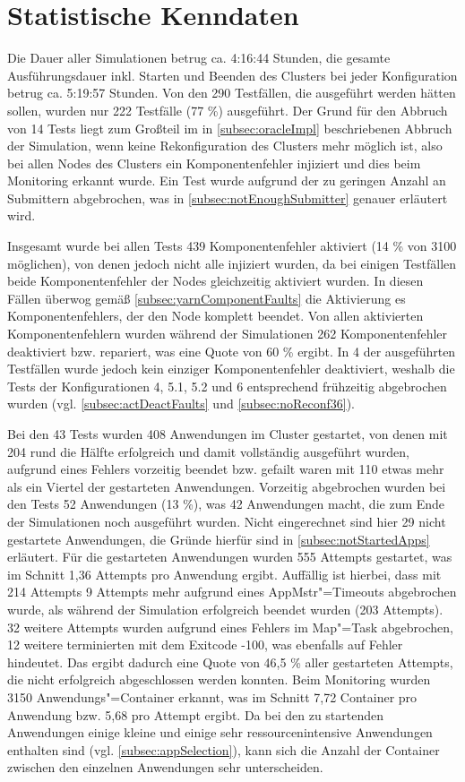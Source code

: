 \section{Statistische Kenndaten}
\label{sec:evaluationStats}

Die Dauer aller Simulationen betrug ca. 4:16:44 Stunden, die gesamte Ausführungsdauer inkl. Starten und Beenden des Clusters bei jeder Konfiguration betrug ca. 5:19:57 Stunden.
Von den 290 Testfällen, die ausgeführt werden hätten sollen, wurden nur 222 Testfälle (77 \%) ausgeführt.
Der Grund für den Abbruch von 14 Tests liegt zum Großteil im in \cref{subsec:oracleImpl} beschriebenen Abbruch der Simulation, wenn keine Rekonfiguration des Clusters mehr möglich ist, also bei allen Nodes des Clusters ein Komponentenfehler injiziert und dies beim Monitoring erkannt wurde.
Ein Test wurde aufgrund der zu geringen Anzahl an Submittern abgebrochen, was in \cref{subsec:notEnoughSubmitter} genauer erläutert wird.

Insgesamt wurde bei allen Tests 439 Komponentenfehler aktiviert (14 \% von 3100 möglichen), von denen jedoch nicht alle injiziert wurden, da bei einigen Testfällen beide Komponentenfehler der Nodes gleichzeitig aktiviert wurden.
In diesen Fällen überwog gemäß \cref{subsec:yarnComponentFaults} die Aktivierung es Komponentenfehlers, der den Node komplett beendet.
Von allen aktivierten Komponentenfehlern wurden während der Simulationen 262 Komponentenfehler deaktiviert bzw. repariert, was eine Quote von 60 \% ergibt.
In 4 der ausgeführten Testfällen wurde jedoch kein einziger Komponentenfehler deaktiviert, weshalb die Tests der Konfigurationen 4, 5.1, 5.2 und 6 entsprechend frühzeitig abgebrochen wurden (vgl. \cref{subsec:actDeactFaults} und \cref{subsec:noReconf36}).

Bei den 43 Tests wurden 408 Anwendungen im Cluster gestartet, von denen mit 204 rund die Hälfte erfolgreich und damit vollständig ausgeführt wurden, aufgrund eines Fehlers vorzeitig beendet bzw. gefailt waren mit 110 etwas mehr als ein Viertel der gestarteten Anwendungen.
Vorzeitig abgebrochen wurden bei den Tests 52 Anwendungen (13 \%), was 42 Anwendungen macht, die zum Ende der Simulationen noch ausgeführt wurden.
Nicht eingerechnet sind hier 29 nicht gestartete Anwendungen, die Gründe hierfür sind in \cref{subsec:notStartedApps} erläutert.
Für die gestarteten Anwendungen wurden 555 Attempts gestartet, was im Schnitt 1,36 Attempts pro Anwendung ergibt.
Auffällig ist hierbei, dass mit 214 Attempts 9 Attempts mehr aufgrund eines \ac{AppMstr}"=Timeouts abgebrochen wurde, als während der Simulation erfolgreich beendet wurden (203 Attempts).
32 weitere Attempts wurden aufgrund eines Fehlers im Map"=Task abgebrochen, 12 weitere terminierten mit dem Exitcode -100, was ebenfalls auf Fehler hindeutet.
Das ergibt dadurch eine Quote von 46,5 \% aller gestarteten Attempts, die nicht erfolgreich abgeschlossen werden konnten.
Beim Monitoring wurden 3150 Anwendungs"=Container erkannt, was im Schnitt 7,72 Container pro Anwendung bzw. 5,68 pro Attempt ergibt.
Da bei den zu startenden Anwendungen einige kleine und einige sehr ressourcenintensive Anwendungen enthalten sind (vgl. \cref{subsec:appSelection}), kann sich die Anzahl der Container zwischen den einzelnen Anwendungen sehr unterscheiden.

